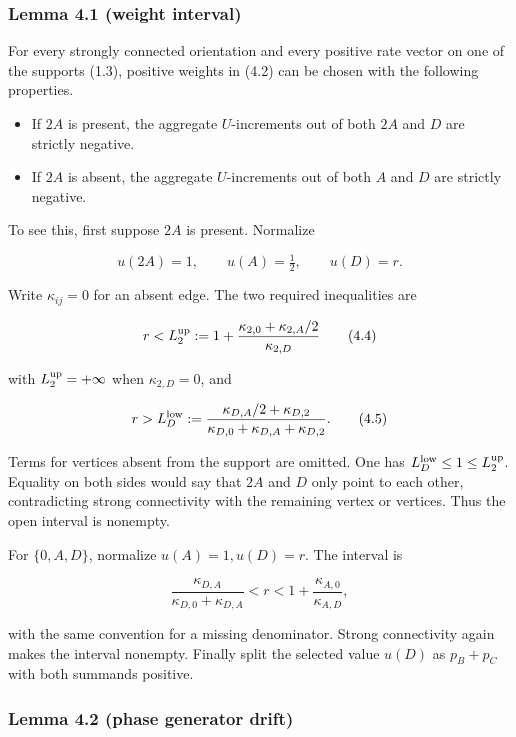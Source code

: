 \subsubsection{Lemma 4.1 (weight
interval)}

For every strongly connected orientation and every positive rate vector
on one of the supports (1.3), positive weights in (4.2) can be chosen
with the following properties.

\begin{itemize}
\tightlist
\item
  If \(2A\) is present, the aggregate \(U\)-increments out of both
  \(2A\) and \(D\) are strictly negative.
\item
  If \(2A\) is absent, the aggregate \(U\)-increments out of both \(A\)
  and \(D\) are strictly negative.
\end{itemize}

To see this, first suppose \(2A\) is present. Normalize

\[
 u(2A)=1,\qquad u(A)=\tfrac12,\qquad u(D)=r.
\tag{4.3}
\]

Write \(\kappa_{ij}=0\) for an absent edge. The two required
inequalities are

\[
 r<L_2^{\rm up}:=
 1+\frac{\kappa_{2,0}+\kappa_{2,A}/2}{\kappa_{2,D}}
\tag{4.4}
\]

with \(L_2^{\rm up}=+\infty\) when \(\kappa_{2,D}=0\), and

\[
 r>L_D^{\rm low}:=
 \frac{\kappa_{D,A}/2+\kappa_{D,2}}
 {\kappa_{D,0}+\kappa_{D,A}+\kappa_{D,2}}.
\tag{4.5}
\]

Terms for vertices absent from the support are omitted. One has
\(L_D^{\rm low}\le1\le L_2^{\rm up}\). Equality on both sides would say
that \(2A\) and \(D\) only point to each other, contradicting strong
connectivity with the remaining vertex or vertices. Thus the open
interval is nonempty.

For \(\{0,A,D\}\), normalize \(u(A)=1,u(D)=r\). The interval is

\[
 \frac{\kappa_{D,A}}{\kappa_{D,0}+\kappa_{D,A}}
 <r<
 1+\frac{\kappa_{A,0}}{\kappa_{A,D}},
\tag{4.6}
\]

with the same convention for a missing denominator. Strong connectivity
again makes the interval nonempty. Finally split the selected value
\(u(D)\) as \(p_B+p_C\) with both summands positive.

\subsubsection{Lemma 4.2 (phase generator
drift)}

